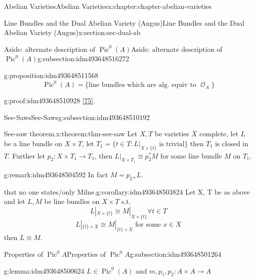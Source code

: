 \documentclass[oneside,10pt,]{book}
\numberwithin{equation}{section}
\newcommand{\sheaf}[1]{\operatorname{\mathcal{#1}}}
\DeclareMathOperator{\Pic}{Pic}
\begin{document}
\begin{chapterptx}{Abelian Varieties}{}{Abelian Varieties}{}{}{x:chapter:chapter-abelian-varieties}
\begin{sectionptx}{Line Bundles and the Dual Abelian Variety (Angus)}{}{Line Bundles and the Dual Abelian Variety (Angus)}{}{}{x:section:sec-dual-ab}
\begin{subsectionptx}{Aside: alternate description of \(\Pic^0(A)\)}{}{Aside: alternate description of \(\Pic^0(A)\)}{}{}{g:subsection:idm493648516272}
\begin{proposition}{}{}{g:proposition:idm493648511568}
%
\begin{equation*}
\Pic^0(A) = \{\text{line bundles which are alg. equiv to } \sheaf O_A\}
\end{equation*}
%
\end{proposition}
\begin{proofptx}{}{g:proof:idm493648510928}
\hyperlink{x:biblio:bib-polishchuck}{[75]}.%
\end{proofptx}
\end{subsectionptx}
%
%
\typeout{************************************************}
\typeout{************************************************}
%
\begin{subsectionptx}{See-Saws}{}{See-Saws}{}{}{g:subsection:idm493648510192}
\begin{theorem}{See-saw theorem.}{}{x:theorem:thm-see-saw}%
Let \(X,T\) be varieties      \(X\) complete, let \(L\) be a line bundle  on \(X\times T\), let \(T_1 = \{t\in T : L|_{X\times\{t\}} \text{ is trivial}\}\) then \(T_1\) is closed in \(T\). Further let \(p_2\colon X\times T_1 \to T_1\), then \(L|_{X\times T_1} \cong p^*_2 M\) for some line bundle \(M\) on \(T_1\).%
\end{theorem}
\begin{remark}{}{g:remark:idm493648504592}%
In fact \(M = p_{2*}L\).%
\end{remark}
\begin{corollary}{that no one states\slash{}only Milne.}{}{g:corollary:idm493648503824}%
Let X, T be as above and let \(L, M\) be line bundles on \(X\times T\) s.t.%
\begin{equation*}
L|_{X\times \{t\}} \cong M|_{X\times \{t\}} \forall t\in T
\end{equation*}
%
\begin{equation*}
L|_{\{t\}\times X} \cong M|_{\{t\}\times X} \text{ for some } x\in X
\end{equation*}
then \(L\cong M\).%
\end{corollary}
\end{subsectionptx}
%
%
\typeout{************************************************}
\typeout{Subsection 1.7.4 Properties of \(\Pic^0 A\)}
\typeout{************************************************}
%
\begin{subsectionptx}{Properties of \(\Pic^0 A\)}{}{Properties of \(\Pic^0 A\)}{}{}{g:subsection:idm493648501264}
\begin{lemma}{}{}{g:lemma:idm493648500624}%
\(L\in \Pic^0(A)\) and \(m,p_1,p_2\colon A\times A \to A\)%
\begin{enumerate}

\end{enumerate}
\end{lemma}
\end{subsectionptx}
\end{sectionptx}
\end{chapterptx}
\end{document}
